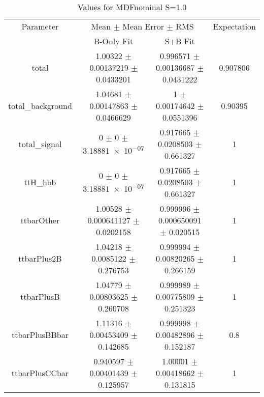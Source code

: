 \begin{table}
\centering
\caption{Values for MDFnominal S=1.0}
\begin{tabular}{cccc}
\toprule
Parameter & \multicolumn{2}{c}{Mean $\pm$ Mean Error $\pm$ RMS} & Expectation\\
 & B-Only Fit & S+B Fit & \\
\midrule
total & \num{1.00322} $\pm$ \num{0.00137219} $\pm$ \num{0.0433201} & \num{0.996571} $\pm$ \num{0.00136687} $\pm$ \num{0.0431222} & \num{0.907806}\\
total\_background & \num{1.04681} $\pm$ \num{0.00147863} $\pm$ \num{0.0466629} & \num{1} $\pm$ \num{0.00174642} $\pm$ \num{0.0551396} & \num{0.90395}\\
total\_signal & \num{0} $\pm$ \num{0} $\pm$ \num{3.18881e-07} & \num{0.917665} $\pm$ \num{0.0208503} $\pm$ \num{0.661327} & \num{1}\\
ttH\_hbb & \num{0} $\pm$ \num{0} $\pm$ \num{3.18881e-07} & \num{0.917665} $\pm$ \num{0.0208503} $\pm$ \num{0.661327} & \num{1}\\
ttbarOther & \num{1.00528} $\pm$ \num{0.000641127} $\pm$ \num{0.0202158} & \num{0.999996} $\pm$ \num{0.000650091} $\pm$ \num{0.020515} & \num{1}\\
ttbarPlus2B & \num{1.04218} $\pm$ \num{0.0085122} $\pm$ \num{0.276753} & \num{0.999994} $\pm$ \num{0.00820265} $\pm$ \num{0.266159} & \num{1}\\
ttbarPlusB & \num{1.04779} $\pm$ \num{0.00803625} $\pm$ \num{0.260708} & \num{0.999989} $\pm$ \num{0.00775809} $\pm$ \num{0.251323} & \num{1}\\
ttbarPlusBBbar & \num{1.11316} $\pm$ \num{0.00453409} $\pm$ \num{0.142685} & \num{0.999998} $\pm$ \num{0.00482896} $\pm$ \num{0.152187} & \num{0.8}\\
ttbarPlusCCbar & \num{0.940597} $\pm$ \num{0.00401439} $\pm$ \num{0.125957} & \num{1.00001} $\pm$ \num{0.00418662} $\pm$ \num{0.131815} & \num{1}\\
\bottomrule
\end{tabular}
\end{table}